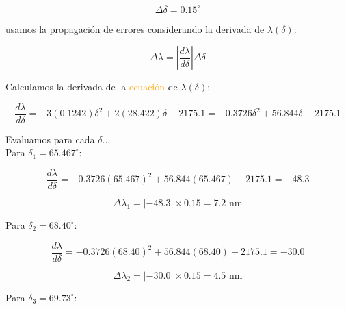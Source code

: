 \documentclass{article}
\begin{document}
\[
\Delta \delta = 0.15^\circ
\]

usamos la propagación de errores considerando la derivada de \(\lambda(\delta)\):

\[
\Delta \lambda = \left| \frac{d\lambda}{d\delta} \right| \Delta \delta
\]

Calculamos la derivada de la \textcolor{orange}{ ecuación }\textcolor{black} de \(\lambda(\delta)\):

\[
\frac{d\lambda}{d\delta} = -3(0.1242) \delta^2 + 2(28.422) \delta - 2175.1 = -0.3726 \delta^2 + 56.844 \delta - 2175.1
\]

Evaluamos para cada \(\delta\)...\\

Para \(\delta_1 = 65.467^\circ\):

\[
\frac{d\lambda}{d\delta} = -0.3726 (65.467)^2 + 56.844 (65.467) - 2175.1 = -48.3
\]

\[
\Delta \lambda_1 = | -48.3 | \times 0.15 = 7.2 \text{ nm}
\]

Para \(\delta_2 = 68.40^\circ\):

\[
\frac{d\lambda}{d\delta} = -0.3726 (68.40)^2 + 56.844 (68.40) - 2175.1 = -30.0
\]

\[
\Delta \lambda_2 = | -30.0 | \times 0.15 = 4.5 \text{ nm}
\]

Para \(\delta_3 = 69.73^\circ\):
\end{document}
